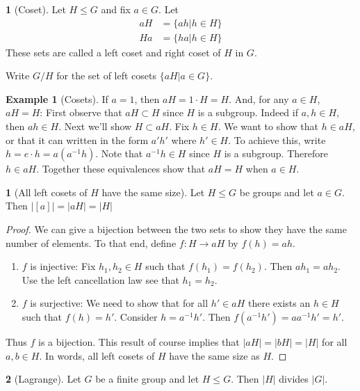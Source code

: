 \documentclass[12pt]{article}
\theoremstyle{definition}
\newtheorem{definition}{\color{NavyBlue}{\textbf{Definition}}}
\newtheorem{theorem}{\color{ForestGreen}{\textbf{Theorem}}}
\newtheorem{example}{\color{WildStrawberry}Example}
\theoremstyle{definition}
\begin{document}
\begin{definition}[Coset]
Let $H \leq G$ and fix $a \in G$. Let
\begin{align*}
aH &= \{ ah | h \in H \} \\
Ha &= \{ ha | h \in H \} 
\end{align*}
These sets are called a left coset and right coset of $H$ in $G$. 

Write $G/H$ for the set of left cosets $\{aH | a \in G \}$.
\end{definition}

\begin{example}[Cosets]
If $a=1$, then $aH = 1 \cdot H = H$. And, for any $a \in H$, $aH = H$: First observe that $aH \subset H$ since $H$ is a subgroup. Indeed if $a,h \in H$, then $ah \in H$. Next we'll show $H \subset aH$. Fix $h \in H$. We want to show that $h \in aH$, or that it can written in the form $a'h'$ where $h' \in H$. To achieve this, write $h = e \cdot h = a (a^{-1} h)$. Note that $a^{-1} h \in H$ since $H$ is a subgroup. Therefore $h \in aH$. Together these equivalences show that $aH = H$ when $a \in H$. 
\end{example}

\begin{theorem}[All left cosets of $H$ have the same size]
Let $H \leq G$ be groups and let $a \in G$. Then $|[a] | = |aH| = |H|$
\end{theorem}
\begin{proof}
We can give a bijection between the two sets to show they have the same number of elements. To that end, define $f: H \to aH$ by $f(h) = ah$. 
\begin{enumerate}
	\item $f$ is injective: Fix $h_1, h_2 \in H$ such that $f(h_1) = f(h_2)$. Then $a h_1 = a h_2$. Use the left cancellation law see that $h_1 = h_2$. 
	\item $f$ is surjective: We need to show that for all $h' \in aH$ there exists an $h \in H$ such that $f(h) = h'$. Consider $h = a^{-1} h'$. Then $f(a^{-1} h') = a a^{-1} h' = h'$. 
\end{enumerate}
Thus $f$ is a bijection. This result of course implies that $|aH| = |bH| = |H|$ for all $a, b \in H$. In words, all left cosets of $H$ have the same size as $H$. 
\end{proof}

\begin{theorem}[Lagrange]
	Let $G$ be a finite group and let $H \leq G$. Then $|H|$ divides $|G|$.
\end{theorem}
\end{document}
